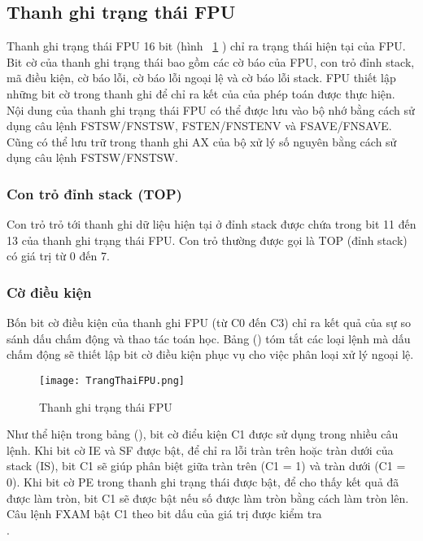 		\newpage
		\subsection*{ Thanh ghi trạng thái FPU}
	Thanh ghi trạng thái FPU 16 bit (hình ~\ref{fig:TrangThaiFPU} ) chỉ ra trạng thái hiện tại của FPU. Bit cờ của thanh ghi trạng thái bao gồm các cờ báo của FPU, con trỏ đỉnh stack, mã điều kiện, cờ báo lỗi, cờ báo lỗi ngoại lệ và cờ báo lỗi stack. FPU thiết lập những bit cờ trong thanh ghi để chỉ ra kết của của phép toán được thực hiện.\\

	Nội dung của thanh ghi trạng thái FPU có thể được lưu vào bộ nhớ bằng cách sử dụng câu lệnh FSTSW/FNSTSW, FSTEN/FNSTENV và FSAVE/FNSAVE. Cũng có thể lưu trữ trong thanh ghi AX của bộ xử lý số nguyên bằng cách sử dụng câu lệnh FSTSW/FNSTSW.\\

		\subsubsection*{Con trỏ đỉnh stack (TOP)}
	Con trỏ trỏ tới thanh ghi dữ liệu hiện tại ở đỉnh stack được chứa trong bit 11 đến 13 của thanh ghi trạng thái FPU. Con trỏ thường được gọi là TOP (đỉnh stack) có giá trị từ 0 đến 7.

		\subsubsection*{ Cờ điều kiện}
	Bốn bit cờ điều kiện của thanh ghi FPU (từ C0 đến C3) chỉ ra kết quả của sự so sánh dấu chấm động và thao tác toán học. Bảng () tóm tắt các loại lệnh mà dấu chấm động sẽ thiết lập bit cờ điều kiện phục vụ cho việc phân loại xử lý ngoại lệ.
	
		\begin{center}
			\begin{figure}[htp]
				\begin{center}
					\texttt{[image: TrangThaiFPU.png]}
				\end{center}
				\caption{Thanh ghi trạng thái FPU}				
				\label{fig:TrangThaiFPU}				
			\end{figure}
		\end{center}	
		
		Như thể hiện trong bảng (), bit cờ điểu kiện C1 được sử dụng trong nhiều câu lệnh. Khi bit cờ IE và SF được bật, để chỉ ra lỗi tràn trên hoặc tràn dưới của stack (IS), bit C1 sẽ giúp phân biệt giữa tràn trên (C1 = 1) và tràn dưới (C1 = 0). Khi bit cờ PE trong thanh ghi trạng thái được bật, để cho thấy kết quả đã được làm tròn, bit C1 sẽ được bật nếu số được làm tròn bằng cách làm tròn lên. Câu lệnh FXAM bật C1 theo bit dấu của giá trị được kiểm tra\\.

